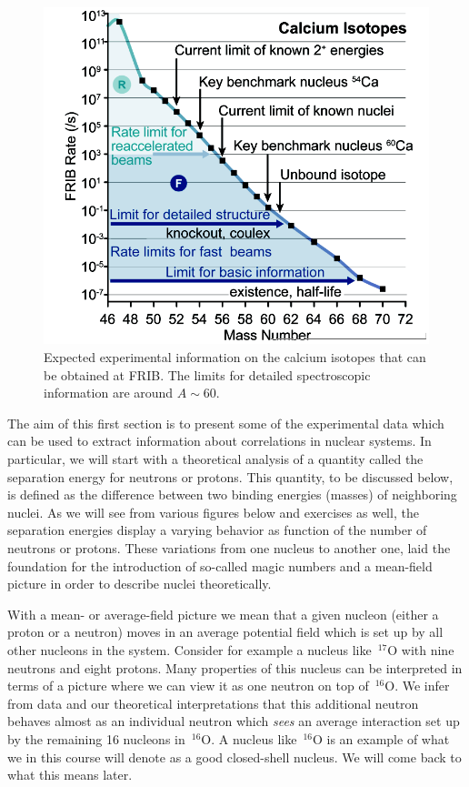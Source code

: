 \documentclass[%
twoside,                 %
final,                   %
10pt]{article}
\begin{document}
\begin{figure}[t]
  \centerline{\includegraphics[width=0.6\linewidth]{fig-intro/careach.png}}
  \caption{
  Expected experimental information on the calcium isotopes that can be obtained at FRIB. The limits for detailed spectroscopic information are around $A\sim 60$.
  }
\end{figure}



The aim of this first section is to present some of the experimental data which can be used to extract 
information about correlations in nuclear systems. In particular, we will start with a theoretical analysis of a quantity called the separation energy for neutrons or protons. This quantity, to be discussed below, is defined as the difference between two binding energies (masses) of neighboring nuclei. As we will see from various figures below and exercises as well, the separation energies display a varying behavior as function of the number of neutrons or protons. These variations from one nucleus to another one, laid the foundation for the introduction of so-called magic numbers and a mean-field picture in order to describe nuclei theoretically.



With a mean- or average-field picture we mean that a given nucleon (either a proton or a neutron) moves in an average potential field which is set up by all other nucleons in the system. Consider for example a nucleus like $\,{}^{17}\mbox{O}$ with nine neutrons and eight protons. Many properties  of this nucleus can be interpreted in terms of a picture where we can view it as
one neutron on top of $\,{}^{16}\mbox{O}$. We infer from data and our theoretical interpretations that this additional neutron behaves almost as an individual neutron which \emph{sees} an average interaction set up by the remaining 16 nucleons in   $\,{}^{16}\mbox{O}$. A nucleus like $\,{}^{16}\mbox{O}$ is an example of what we in this course will denote as a good closed-shell nucleus. We will come back to what this means later.
\end{document}
